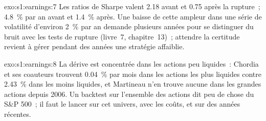 \begin{solution}{exo:s1:earnings:7}
Les ratios de Sharpe valent 2.18 avant et 0.75 après la rupture~; 4.8~\% par an avant et 1.4~\% après. Une baisse de cette ampleur dans une série de volatilité d'environ 2~\% par
an demande plusieurs années pour se distinguer du bruit avec les tests de rupture (livre~7, chapitre~13)~; attendre la certitude revient à gérer pendant des années une stratégie affaiblie.
\end{solution}

\begin{solution}{exo:s1:earnings:8}
La dérive est concentrée dans les actions peu liquides~: Chordia et ses coauteurs trouvent 0.04~\% par mois dans les actions les plus liquides contre 2.43~\% dans les moins liquides, et
Martineau n'en trouve aucune dans les grandes actions depuis 2006. Un backtest sur l'ensemble des actions dit peu de chose du S\&P 500~; il faut le lancer sur cet univers, avec les coûts, et sur des
années récentes.
\end{solution}

